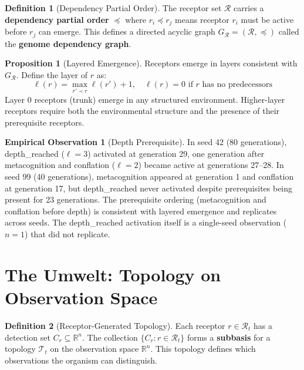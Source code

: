 \documentclass[12pt]{article}
\theoremstyle{definition}
\newtheorem{definition}{Definition}
\newtheorem{proposition}{Proposition}
\newtheorem{observation}{Empirical Observation}
\begin{document}
\begin{definition}[Dependency Partial Order]
The receptor set $\mathcal{R}$ carries a \textbf{dependency partial order} $\preceq$ where
$r_i \preceq r_j$ means receptor $r_i$ must be active before $r_j$ can emerge. This
defines a directed acyclic graph $G_\mathcal{R} = (\mathcal{R}, \preceq)$ called the
\textbf{genome dependency graph}.
\end{definition}

\begin{proposition}[Layered Emergence]
Receptors emerge in layers consistent with $G_\mathcal{R}$. Define the layer of $r$ as:
\[
\ell(r) = \max_{r' \prec r} \ell(r') + 1, \quad \ell(r) = 0 \text{ if } r \text{ has no predecessors}
\]
Layer 0 receptors (trunk) emerge in any structured environment. Higher-layer receptors
require both the environmental structure and the presence of their prerequisite receptors.
\end{proposition}

\begin{observation}[Depth Prerequisite]
In seed 42 (80 generations), depth\_reached ($\ell = 3$) activated at generation 29,
one generation after metacognition and conflation ($\ell = 2$) became active at
generations 27--28. In seed 99 (40 generations), metacognition appeared at generation 1
and conflation at generation 17, but depth\_reached never activated despite prerequisites
being present for 23 generations. The prerequisite ordering (metacognition and conflation
before depth) is consistent with layered emergence and replicates across seeds. The
depth\_reached activation itself is a single-seed observation ($n=1$) that did not
replicate.
\end{observation}

\section{The Umwelt: Topology on Observation Space}

\begin{definition}[Receptor-Generated Topology]
Each receptor $r \in \mathcal{R}_t$ has a detection set $C_r \subseteq \mathbb{R}^n$.
The collection $\{C_r : r \in \mathcal{R}_t\}$ forms a \textbf{subbasis} for a topology
$\mathcal{T}_t$ on the observation space $\mathbb{R}^n$. This topology defines which
observations the organism can distinguish.
\end{definition}
\end{document}
